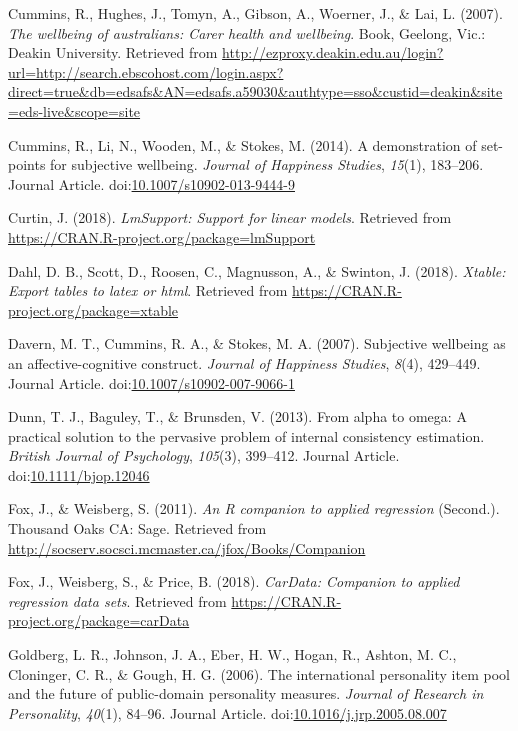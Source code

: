 \documentclass[man,floatsintext]{apa6}
\theoremstyle{definition}
\theoremstyle{definition}
\theoremstyle{definition}
\theoremstyle{remark}
\begin{document}
\hypertarget{ref-RN546}{}
Cummins, R., Hughes, J., Tomyn, A., Gibson, A., Woerner, J., \& Lai, L.
(2007). \emph{The wellbeing of australians: Carer health and wellbeing}.
Book, Geelong, Vic.: Deakin University. Retrieved from
\url{http://ezproxy.deakin.edu.au/login?url=http://search.ebscohost.com/login.aspx?direct=true\&db=edsafs\&AN=edsafs.a59030\&authtype=sso\&custid=deakin\&site=eds-live\&scope=site}

\hypertarget{ref-RN305}{}
Cummins, R., Li, N., Wooden, M., \& Stokes, M. (2014). A demonstration
of set-points for subjective wellbeing. \emph{Journal of Happiness
Studies}, \emph{15}(1), 183--206. Journal Article.
doi:\href{https://doi.org/10.1007/s10902-013-9444-9}{10.1007/s10902-013-9444-9}

\hypertarget{ref-R-lmSupport}{}
Curtin, J. (2018). \emph{LmSupport: Support for linear models}.
Retrieved from \url{https://CRAN.R-project.org/package=lmSupport}

\hypertarget{ref-R-xtable}{}
Dahl, D. B., Scott, D., Roosen, C., Magnusson, A., \& Swinton, J.
(2018). \emph{Xtable: Export tables to latex or html}. Retrieved from
\url{https://CRAN.R-project.org/package=xtable}

\hypertarget{ref-RN417}{}
Davern, M. T., Cummins, R. A., \& Stokes, M. A. (2007). Subjective
wellbeing as an affective-cognitive construct. \emph{Journal of
Happiness Studies}, \emph{8}(4), 429--449. Journal Article.
doi:\href{https://doi.org/10.1007/s10902-007-9066-1}{10.1007/s10902-007-9066-1}

\hypertarget{ref-RN531}{}
Dunn, T. J., Baguley, T., \& Brunsden, V. (2013). From alpha to omega: A
practical solution to the pervasive problem of internal consistency
estimation. \emph{British Journal of Psychology}, \emph{105}(3),
399--412. Journal Article.
doi:\href{https://doi.org/10.1111/bjop.12046}{10.1111/bjop.12046}

\hypertarget{ref-R-car}{}
Fox, J., \& Weisberg, S. (2011). \emph{An R companion to applied
regression} (Second.). Thousand Oaks CA: Sage. Retrieved from
\url{http://socserv.socsci.mcmaster.ca/jfox/Books/Companion}

\hypertarget{ref-R-carData}{}
Fox, J., Weisberg, S., \& Price, B. (2018). \emph{CarData: Companion to
applied regression data sets}. Retrieved from
\url{https://CRAN.R-project.org/package=carData}

\hypertarget{ref-RN566}{}
Goldberg, L. R., Johnson, J. A., Eber, H. W., Hogan, R., Ashton, M. C.,
Cloninger, C. R., \& Gough, H. G. (2006). The international personality
item pool and the future of public-domain personality measures.
\emph{Journal of Research in Personality}, \emph{40}(1), 84--96. Journal
Article.
doi:\href{https://doi.org/10.1016/j.jrp.2005.08.007}{10.1016/j.jrp.2005.08.007}
\end{document}
